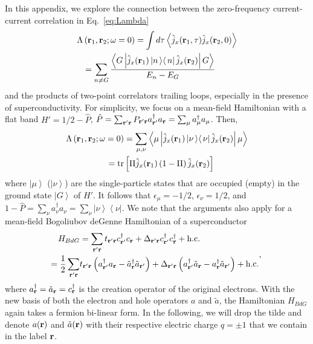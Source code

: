 \documentclass[amsmath,amssymb, aps, prx, longbibliography, twocolumn]{revtex4-1}
\begin{document}
In this appendix, we explore the connection between the zero-frequency current-current correlation in Eq.~\eqref{eq:Lambda}
\begin{equation}
\left. \begin{aligned}
\Lambda&\left({\bf r}_1, {\bf r}_2;\omega=0\right) = \int d\tau \left\langle \hat{j}_x({\bf r}_1,\tau)\hat{j}_x({\bf r}_2,0) \right\rangle  \\
&=\sum_{n\ne G} \frac{\left\langle G \left| \hat{j}_x({\bf r}_1)  \left|n\left\rangle  \right\langle n\right| \hat{j}_x({\bf r}_2)\right| G\right\rangle}{E_n-E_G} 
\end{aligned}
\right.
\end{equation}
and the products of two-point correlators trailing loops, especially in the presence of superconductivity. For simplicity, we focus on a mean-field Hamiltonian with a flat band $H'=1/2-\hat P$, $\hat P=\sum_{{\bf r}'{\bf r}}P_{{\bf r}'{\bf r}}a^\dagger_{{\bf r}'} a_{\bf r}=\sum_{\mu}a^\dagger_\mu a_\mu$. Then, 
\begin{equation}
\left. \begin{aligned}
\Lambda\left({\bf r}_1, {\bf r}_2;\omega=0\right)&
=\sum_{\mu, \nu}\left\langle \mu \left| \hat{j}_x({\bf r}_1)  \left|\nu\left\rangle  \right\langle \nu\right|\hat{j}_x({\bf r}_2)\right| \mu\right\rangle \\
= \mbox{tr}&\left[\Pi \hat{j}_x({\bf r}_1) \left(1-\Pi\right) \hat{j}_x({\bf r}_2)\right]
\end{aligned}
\right.
\label{eq:app1}
\end{equation}
where $\left|\mu\right\rangle$ ($\left|\nu\right\rangle$) are the single-particle states that are occupied (empty) in the ground state $\left|G\right\rangle$ of $H'$. It follows that $\epsilon_\mu=-1/2$, $\epsilon_\nu=1/2$, and $1-\hat P=\sum_{\nu}a^\dagger_\nu a_\nu=\sum_{\nu}\left|\nu\right\rangle\left\langle\nu\right|$. We note that the arguments also apply for a mean-field Bogoliubov deGenne Hamiltonian of a superconductor
\begin{equation}
\left. \begin{aligned}
H_{BdG} & =  \sum_{\bf{r}'\bf{r}}t_{\bf{r}'\bf{r}}c_{\bf{r}'}^{\dagger}c_{\bf{r}}+\Delta_{\bf{r}'\bf{r}}c_{\bf{r}'}^{\dagger}c_{\bf{r}}^{\dagger}+\mbox{h.c.}\\
=\frac{1}{2}\sum_{\bf{r}'\bf{r}}&t_{\bf{r}'\bf{r}}\left(a_{\bf{r}'}^{\dagger}a_{\bf{r}}-\tilde{a}_{\bf{r}}^{\dagger}\tilde{a}_{\bf{r}'}\right)
+\Delta_{\bf{r}'\bf{r}}\left(a_{\bf{r}'}^{\dagger}\tilde{a}_{\bf{r}}-a_{\bf{r}}^{\dagger}\tilde{a}_{\bf{r}'}\right)+\mbox{h.c.}
\end{aligned},
\right.
\end{equation}
where $a_{\bf{r}}^\dagger=\tilde{a}_{\bf{r}}=c_{\bf{r}}^\dagger$ is the creation operator of the original electrons. With the new basis of both the electron and hole operators $a$ and $\tilde{a}$, the Hamiltonian $H_{BdG}$ again takes a fermion bi-linear form. In the following, we will drop the tilde and denote $a(\bf{r})$ and $\tilde{a}(\bf{r})$ with their respective electric charge $q=\pm 1$ that we contain in the label $\bf{r}$.
\end{document}
